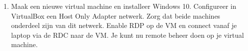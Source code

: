 \begin{enumerate}
\item Maak een nieuwe virtual machine en installeer Windows 10. Configureer in VirtualBox een Host Only Adapter netwerk. Zorg dat beide machines onderdeel zijn van dit netwerk. Enable RDP op de VM en connect vanaf je laptop via de RDC naar de VM. Je kunt nu remote beheer doen op je virtual machine.
\end{enumerate}
